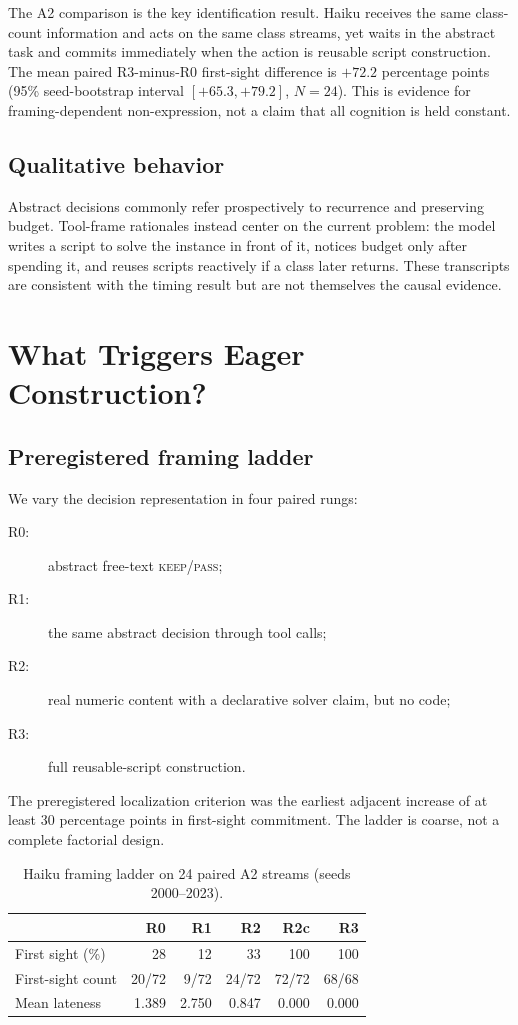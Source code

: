 \documentclass{article}
\begin{document}
The A2 comparison is the key identification result. Haiku receives the same
class-count information and acts on the same class streams, yet waits in the
abstract task and commits immediately when the action is reusable script
construction. The mean paired R3-minus-R0 first-sight difference is $+72.2$
percentage points (95\% seed-bootstrap interval $[+65.3,+79.2]$, $N=24$). This
is
evidence for framing-dependent non-expression, not a claim that all cognition
is held constant.

\subsection{Qualitative behavior}

Abstract decisions commonly refer prospectively to recurrence and preserving
budget. Tool-frame rationales instead center on the current problem: the model
writes a script to solve the instance in front of it, notices budget only after
spending it, and reuses scripts reactively if a class later returns. These
transcripts are consistent with the timing result but are not themselves the
causal evidence.

\section{What Triggers Eager Construction?}
\label{sec:ladder}

\subsection{Preregistered framing ladder}

We vary the decision representation in four paired rungs:
\begin{description}
    \item[R0:] abstract free-text \textsc{keep}/\textsc{pass};
    \item[R1:] the same abstract decision through tool calls;
    \item[R2:] real numeric content with a declarative solver claim, but no code;
    \item[R3:] full reusable-script construction.
\end{description}
The preregistered localization criterion was the earliest adjacent increase of
at least 30 percentage points in first-sight commitment. The ladder is coarse,
not a complete factorial design.

\begin{table}[t]
\centering
\caption{Haiku framing ladder on 24 paired A2 streams (seeds 2000--2023).}
\label{tab:ladder}
\begin{tabular}{lrrrrr}
\hline
 & R0 & R1 & R2 & R2c & R3 \\
\hline
First sight (\%) & 28 & 12 & 33 & 100 & 100 \\
First-sight count & 20/72 & 9/72 & 24/72 & 72/72 & 68/68 \\
Mean lateness & 1.389 & 2.750 & 0.847 & 0.000 & 0.000 \\
\hline
\end{tabular}
\end{table}
\end{document}
